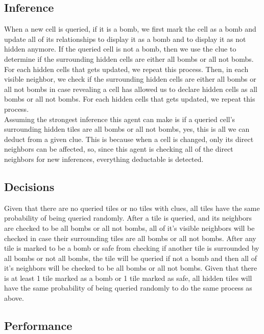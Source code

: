 \documentclass[13pt]{report}
\begin{document}
\subsection*{Inference}
When a new cell is queried, if it is a bomb, we first mark the cell as a bomb and update all of its relationships to display it as a bomb and to display it as not hidden anymore. If the queried cell is not a bomb, then we use the clue to determine if the surrounding hidden cells are either all bombs or all not bombs. For each hidden cells that gets updated, we repeat this process. Then, in each visible neighbor, we check if the surrounding hidden cells are either all bombs or all not bombs in case revealing a cell has allowed us to declare hidden cells as all bombs or all not bombs. For each hidden cells that gets updated, we repeat this process.\\
Assuming the strongest inference this agent can make is if a queried cell's surrounding hidden tiles are all bombs or all not bombs, yes, this is all we can deduct from a given clue. This is because when a cell is changed, only its direct neighbors can be affected, so, since this agent is checking all of the direct neighbors for new inferences, everything deductable is detected.

\subsection*{Decisions}
Given that there are no queried tiles or no tiles with clues, all tiles have the same probability of being queried randomly. After a tile is queried, and its neighbors are checked to be all bombs or all not bombs, all of it's visible neighbors will be checked in case their surrounding tiles are all bombs or all not bombs. After any tile is marked to be a bomb or safe from checking if another tile is surrounded by all bombs or not all bombs, the tile will be queried if not a bomb and then all of it's neighbors will be checked to be all bombs or all not bombs. Given that there is at least 1 tile marked as a bomb or 1 tile marked as safe, all hidden tiles will have the same probability of being queried randomly to do the same process as above.

\subsection*{Performance}
\end{document}
